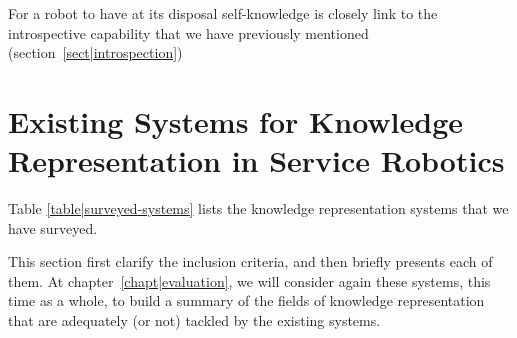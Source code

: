 For a robot to have at its disposal self-knowledge is closely link to the
introspective capability that we have previously mentioned
(section~\ref{sect|introspection})


\section{Existing Systems for Knowledge Representation in Service Robotics}
\label{sect|surveyed-systems}


Table \ref{table|surveyed-systems} lists the knowledge representation
systems that we have surveyed.

This section first clarify the inclusion criteria, and then briefly presents
each of them. At chapter~\ref{chapt|evaluation}, we will consider again these
systems, this time as a whole, to build a summary of the fields of knowledge
representation that are adequately (or not) tackled by the existing systems.

